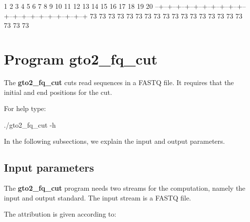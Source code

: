 \documentclass[11pt,]{krantz}
\newenvironment{Shaded}{\begin{snugshade}}{\end{snugshade}}
\newcommand{\ExtensionTok}[1]{#1}
\newcommand{\NormalTok}[1]{#1}
\begin{document}
\begin{Shaded}
\begin{Highlighting}[]
 \ExtensionTok{1}\NormalTok{  2  3  4  5  6  7  8  9 10 11 12 13 14 15 16 17 18 19 20 }
\ExtensionTok{--+--+--+--+--+--+--+--+--+--+--+--+--+--+--+--+--+--+--+--+}
\ExtensionTok{73}\NormalTok{ 73 73 73 73 73 73 73 73 73 73 73 73 73 73 73 73 73 73 73}
\end{Highlighting}
\end{Shaded}

\section{Program gto2\_fq\_cut}\label{program-gto2_fq_cut}

The \textbf{gto2\_fq\_cut} cuts read sequences in a FASTQ file. It
requires that the initial and end positions for the cut.

For help type:

\begin{Shaded}
\begin{Highlighting}[]
\ExtensionTok{./gto2_fq_cut}\NormalTok{ -h}
\end{Highlighting}
\end{Shaded}

In the following subsections, we explain the input and output
parameters.

\subsection*{Input parameters}\label{input-parameters-17}


The \textbf{gto2\_fq\_cut} program needs two streams for the
computation, namely the input and output standard. The input stream is a
FASTQ file.

The attribution is given according to:
\end{document}
